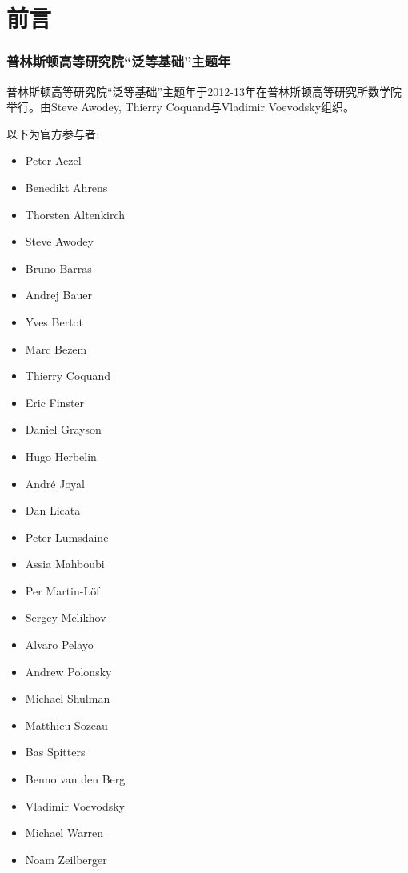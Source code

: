 \chapter*{前言}
\label{cha:preface}

\subsection*{普林斯顿高等研究院“泛等基础”主题年}

普林斯顿高等研究院“泛等基础”主题年于2012-13年在普林斯顿高等研究所数学院举行。由Steve Awodey, Thierry Coquand与Vladimir Voevodsky组织。

以下为官方参与者:

\begin{multicols}{\OPTprefacecols}{
\begin{itemize}
\item[] Peter Aczel
\item[] Benedikt Ahrens
\item[] Thorsten Altenkirch
\item[] Steve Awodey
\item[] Bruno Barras
\item[] Andrej Bauer
\item[] Yves Bertot
\item[] Marc Bezem
\item[] Thierry Coquand
\item[] Eric Finster
\item[] Daniel Grayson
\item[] Hugo Herbelin
\item[] Andr\'e Joyal
\item[] Dan Licata
\item[] Peter Lumsdaine
\item[] Assia Mahboubi
\item[] Per Martin-L\"of
\item[] Sergey Melikhov
\item[] Alvaro Pelayo
\item[] Andrew Polonsky
\item[] Michael Shulman
\item[] Matthieu Sozeau
\item[] Bas Spitters
\item[] Benno van den Berg
\item[] Vladimir Voevodsky
\item[] Michael Warren
\item[] Noam Zeilberger
\end{itemize}
}
\end{multicols}

